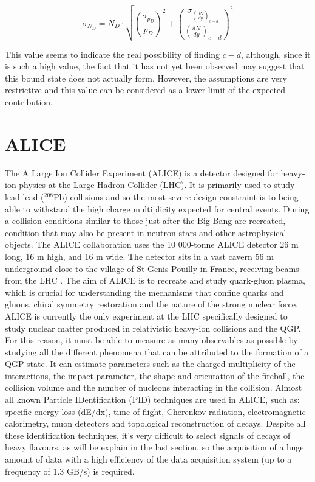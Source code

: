 \documentclass[12pt,a4paper]{book}
\begin{document}
	\begin{equation}
		\sigma_{N_D} = N_D \cdot 
		\sqrt{
			\left(\frac{\sigma_{p_D}}{p_D}\right)^2 +
			\left(\frac{\sigma_{\left(\frac{dN}{dy}\right)_{c-d}}}{\left(\frac{dN}{dy}\right)_{c-d}}\right)^2
		}
	\end{equation}
	
	 This value seems to indicate the real possibility of finding $c-d$, although, since it is such a high value, the fact that it has not yet been observed may suggest that this bound state does not actually form. However, the assumptions are very restrictive and this value can be considered as a lower limit of the expected contribution.
	
	
	\FloatBarrier
	
	\chapter{ALICE}
	
	The A Large Ion Collider Experiment (ALICE) is a detector designed for heavy-ion physics at the Large Hadron Collider (LHC). It is primarily used to study lead-lead ($^{208}\text{Pb}$) collisions and so the most severe design constraint is to being able to withstand the high charge multiplicity expected for central events. During a collision conditions similar to those just after the Big Bang are recreated, condition that may also be present in neutron stars and other astrophysical objects. The ALICE collaboration uses the 10 000-tonne ALICE detector 26 m long, 16 m high, and 16 m wide. The detector sits in a vast cavern 56 m underground close to the village of St Genis-Pouilly in France, receiving beams from the LHC \cite{Alice}.  The aim of ALICE is to recreate and study quark-gluon plasma, which is crucial for understanding the mechanisms that confine quarks and gluons, chiral symmetry restoration and the nature of the strong nuclear force. ALICE is currently the only experiment at the LHC specifically designed to study nuclear matter produced in relativistic heavy-ion collisions and the QGP. For this reason, it must be able to measure as many observables as possible by studying all the different phenomena that can be attributed to the formation of a QGP state. It can estimate parameters such as the charged multiplicity of the interactions, the impact parameter, the shape and orientation of the fireball, the collision volume and the number of nucleons interacting in the collision. Almost all known Particle IDentification (PID) techniques are used in ALICE, such as: specific energy loss (dE/dx), time-of-flight, Cherenkov radiation, electromagnetic calorimetry, muon detectors and topological reconstruction of decays. 
	Despite all these identification techniques, it's very difficult to select signals of decays of heavy flavours, as will be explain in the last section, so the acquisition of a huge amount of data with a high efficiency of the data acquisition system (up to a frequency of 1.3 GB/s) is required. 
	
\end{document}
